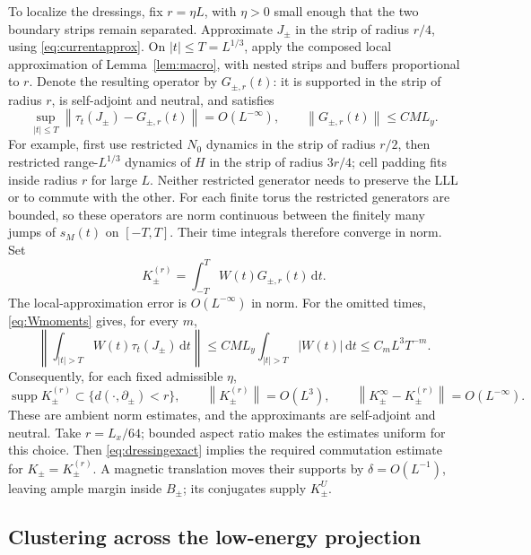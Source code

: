 \documentclass[11pt]{article}
\theoremstyle{definition}
\theoremstyle{remark}
\newcommand{\dd}{\,\mathrm d}
\newcommand{\supp}{\operatorname{supp}}
\newcommand{\norm}[1]{\left\lVert#1\right\rVert}
\begin{document}
To localize the dressings, fix \(r=\eta L\), with \(\eta>0\)
small enough that the two boundary strips remain separated.
Approximate \(J_\pm\) in the strip of radius \(r/4\), using
\eqref{eq:currentapprox}.  On \(|t|\le T=L^{1/3}\), apply the
composed local approximation of Lemma~\ref{lem:macro}, with nested
strips and buffers proportional to \(r\).  Denote the resulting
operator by \(G_{\pm,r}(t)\): it is supported in the strip of
radius \(r\), is self-adjoint and neutral, and satisfies
\[
 \sup_{|t|\le T}\norm{\tau_t(J_\pm)-G_{\pm,r}(t)}
       =O(L^{-\infty}),\qquad
 \norm{G_{\pm,r}(t)}\le CML_y.
\]
For example, first use restricted \(N_0\) dynamics in the strip
of radius \(r/2\), then restricted range-\(L^{1/3}\) dynamics
of \(H\) in the strip of radius \(3r/4\); cell padding fits
inside radius \(r\) for large \(L\).  Neither restricted
generator needs to preserve the LLL or to commute with the other.
For each finite torus the restricted generators are bounded, so these
operators are norm continuous between the finitely many jumps of
\(s_M(t)\) on \([-T,T]\).  Their time integrals therefore converge
in norm.  Set
\[
 K_\pm^{(r)}=\int_{-T}^T W(t)G_{\pm,r}(t)\dd t.
\]
The local-approximation error is \(O(L^{-\infty})\) in norm.
For the omitted times, \eqref{eq:Wmoments} gives, for every \(m\),
\[
 \left\|\int_{|t|>T}W(t)\tau_t(J_\pm)\dd t\right\|
 \le CML_y\int_{|t|>T}|W(t)|\dd t
 \le C_mL^3T^{-m}.
\]
Consequently, for each fixed admissible \(\eta\),
\begin{equation}\label{eq:Kapprox}
 \supp K_\pm^{(r)}\subset\{d(\cdot,\partial_\pm)<r\},\qquad
 \norm{K_\pm^{(r)}}=O(L^3),\qquad
 \norm{K_\pm^\infty-K_\pm^{(r)}}=O(L^{-\infty}).
\end{equation}
These are ambient norm estimates, and the approximants are self-adjoint
and neutral.  Take \(r=L_x/64\); bounded aspect ratio makes the
estimates uniform for this choice.  Then
\eqref{eq:dressingexact} implies the required commutation estimate
for \(K_\pm=K_\pm^{(r)}\).  A magnetic translation moves their
supports by \(\delta=O(L^{-1})\), leaving ample margin inside
\(B_\pm\); its conjugates supply \(K_\pm^U\).

\subsection{Clustering across the low-energy projection}
\end{document}
